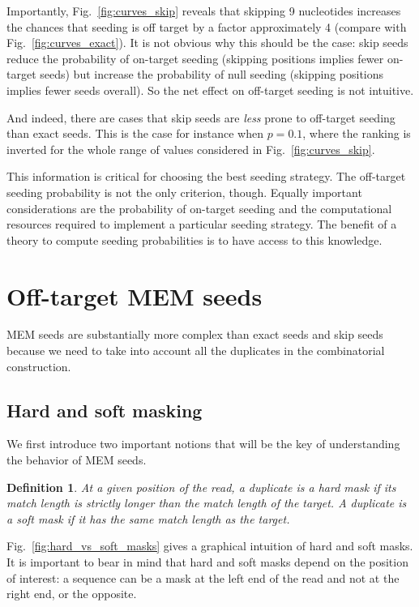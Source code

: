\documentclass{article}
\newtheorem{definition}{Definition}
\begin{document}
Importantly, Fig.~\ref{fig:curves_skip} reveals that skipping 9
nucleotides increases the chances that seeding is off target by a factor
approximately 4 (compare with Fig.~\ref{fig:curves_exact}). It is not
obvious why this should be the case: skip seeds reduce the probability of
on-target seeding (skipping positions implies fewer on-target seeds) but
increase the probability of null seeding (skipping positions implies fewer
seeds overall). So the net effect on off-target seeding is not intuitive.

And indeed, there are cases that skip seeds are \emph{less} prone to
off-target seeding than exact seeds. This is the case for instance when
$p=0.1$, where the ranking is inverted for the whole range of values
considered in Fig.~\ref{fig:curves_skip}.

This information is critical for choosing the best seeding strategy. The
off-target seeding probability is not the only criterion, though. Equally
important considerations are the probability of on-target seeding and the
computational resources required to implement a particular seeding
strategy. The benefit of a theory to compute seeding probabilities is to
have access to this knowledge.


\section{Off-target MEM seeds}

MEM seeds are substantially more complex than exact seeds and skip seeds
because we need to take into account all the duplicates in the
combinatorial construction.


\subsection{Hard and soft masking}

We first introduce two important notions that will be the key of
understanding the behavior of MEM seeds.

\begin{definition}
At a given position of the read, a duplicate is a \emph{hard mask} if its
match length is strictly longer than the match length of the target. A
duplicate is a \emph{soft mask} if it has the same match length as the
target.
\end{definition}

Fig.~\ref{fig:hard_vs_soft_masks} gives a graphical intuition of hard and
soft masks. It is important to bear in mind that hard and soft masks
depend on the position of interest: a sequence can be a mask at the left
end of the read and not at the right end, or the opposite.
\end{document}
